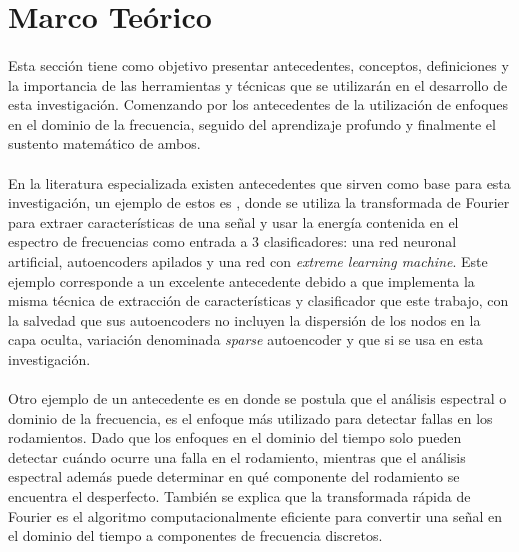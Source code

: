 \documentclass[12pt]{article}%
\begin{document}
\section{Marco Teórico}

\paragraph{}
Esta sección tiene como objetivo presentar antecedentes, conceptos, definiciones y la importancia de las herramientas y técnicas que se utilizarán en el desarrollo de esta investigación. Comenzando por los antecedentes de la utilización de enfoques en el dominio de la frecuencia, seguido del aprendizaje profundo y finalmente el sustento matemático de ambos.

\paragraph{}
En la literatura especializada existen antecedentes que sirven como base para esta investigación, un ejemplo de estos es \cite{mao}, donde se utiliza la transformada de Fourier para extraer características de una señal y usar la energía contenida en el espectro de frecuencias como entrada a 3 clasificadores: una red neuronal artificial, autoencoders apilados y una red con \textit{extreme learning machine}. Este ejemplo corresponde a un excelente antecedente debido a que implementa la misma técnica de extracción de características y clasificador que este trabajo, con la salvedad que sus autoencoders no incluyen la dispersión de los nodos en la capa oculta, variación denominada \textit{sparse} autoencoder y que si se usa en esta investigación.

\paragraph{}
Otro ejemplo de un antecedente es \cite{kanpaj} en donde se postula que el análisis espectral o dominio de la frecuencia, es el enfoque más utilizado para detectar fallas en los rodamientos. Dado que los enfoques en el dominio del tiempo solo pueden detectar cuándo ocurre una falla en el rodamiento, mientras que el análisis espectral además puede determinar en qué componente del rodamiento se encuentra el desperfecto. También se explica que la transformada rápida de Fourier es el algoritmo computacionalmente eficiente para convertir una señal en el dominio del tiempo a componentes de frecuencia discretos.
\end{document}
